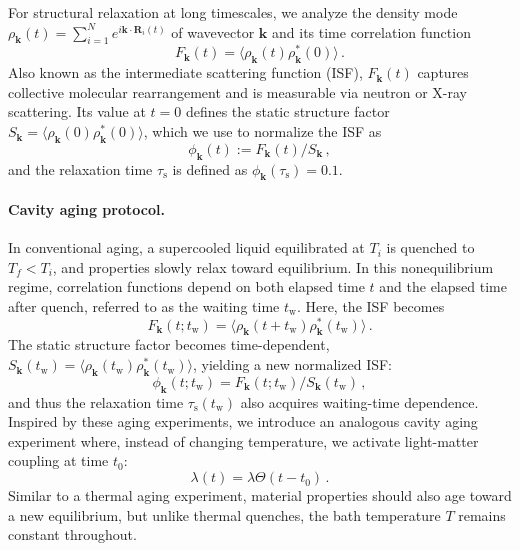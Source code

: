 \documentclass[%
 reprint,
 amsmath,amssymb,
 aps,
]{revtex4-2}
\begin{document}
For structural relaxation at long timescales, we analyze the density mode $\rho_{\bm{k}}(t) = \sum_{i=1}^N e^{i \bm{k} \cdot \bm{R}_i(t)}$ of wavevector $\bm k$ and its time correlation function
\begin{equation}
F_{\bm{k}}(t) = \langle \rho_{\bm{k}}(t)\rho^*_{\bm k}(0) \rangle \,.
\end{equation}
Also known as the intermediate scattering function (ISF),  $F_{\bm k}(t)$ captures collective molecular rearrangement and is measurable via neutron or X-ray scattering. Its value at $t=0$ defines the static structure factor $S_{\bm k}= \langle \rho_{\bm{k}}(0)\rho^*_{\bm k}(0) \rangle$, which we use to normalize the ISF as 
\begin{equation}
\phi_{\bm k}(t) := F_{\bm{k}}(t)/S_{\bm k}\,,
\end{equation}
and the relaxation time $\tau_\mathrm{s}$ is defined as $\phi_{\bm k}(\tau_\mathrm{s}) = 0.1$.

\paragraph*{Cavity aging protocol.} 
In conventional aging, a supercooled liquid equilibrated at $T_i$ is quenched to $T_f < T_i$, and properties slowly relax toward equilibrium. In this nonequilibrium regime, correlation functions depend on both elapsed time $t$ and the elapsed time after quench, referred to as the waiting time $t_\mathrm{w}$. Here, the ISF becomes
\begin{equation}
F_{\bm{k}}(t; t_\mathrm{w}) = \langle \rho_{\bm{k}}(t+t_\mathrm{w}) \rho^*_{\bm k}(t_\mathrm{w}) \rangle \,.
\end{equation}
The static structure factor becomes time-dependent, $S_{\bm k}(t_\mathrm{w}) = \langle \rho_{\bm k}(t_\mathrm{w}) \rho^*_{\bm k}(t_\mathrm{w}) \rangle$, yielding a new normalized ISF:
\begin{equation}
\phi_{\bm k}(t; t_\mathrm{w}) = F_{\bm{k}}(t; t_\mathrm{w})/S_{\bm k}(t_\mathrm{w}) \,,
\end{equation}
and thus the relaxation time $\tau_\mathrm{s}(t_\mathrm{w})$ also acquires waiting-time dependence.
Inspired by these aging experiments, we introduce an analogous cavity aging experiment where, instead of changing temperature, we activate light-matter coupling at time $t_0$:
\begin{equation}
\lambda(t) = \lambda \Theta(t-t_0) \,. \label{eq:varepsilon}
\end{equation}
Similar to a thermal aging experiment, material properties should also age toward a new equilibrium, but unlike thermal quenches, the bath temperature $T$  remains constant throughout.
\end{document}
